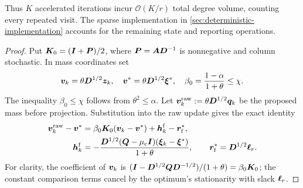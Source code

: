 Thus $K$ accelerated iterations incur $\mathcal{O}(K/r)$ total degree volume,
counting every repeated visit. The sparse implementation in
\cref{sec:deterministic-implementation} accounts for the remaining
state and reporting operations.
\begin{proof}
Put $\bm{K}_0=(\bm{I}+\bm{P})/2$, where $\bm{P}=\bm{A}\bm{D}^{-1}$ is nonnegative
and column stochastic. In mass coordinates set
\[
 \bm{v}_k=\theta\bm{D}^{1/2}\bm{z}_k,\quad
 \bm{v}^*=\theta\bm{D}^{1/2}\bm{\xi}^*,\quad
 \beta_0=\frac{1-\alpha}{1+\theta}\leq\chi.
\]
The inequality $\beta_0\leq\chi$ follows from $\theta^2\leq\alpha$.
Let $\bm{v}_k^{\mathrm{raw}}:=\theta\bm{D}^{1/2}\bm{q}_k$ be the proposed mass
before projection. Substitution into the raw update gives the exact identity
\begin{equation*}
 \begin{aligned}
 \bm{v}_k^{\mathrm{raw}}-\bm{v}^*
   &=\beta_0\bm{K}_0(\bm{v}_k-\bm{v}^*)+\bm{h}_k^{\mathrm{f}}-\bm{r}_{\mathrm{f}}^*,\\
 \bm{h}_k^{\mathrm{f}}&=-\frac{\bm{D}^{1/2}(\bm{Q}-\mu_{\mathrm{c}}\bm{I})
                         (\bm{\xi}_k-\bm{\xi}^*)}{1+\theta},\qquad
 \bm{r}_{\mathrm{f}}^*=\bm{D}^{1/2}\bm{\ell}_r.
 \end{aligned}
\end{equation*}
For clarity, the coefficient of $\bm{v}_k$ is
$(\bm{I}-\bm{D}^{1/2}\bm{Q}\bm{D}^{-1/2})/(1+\theta)=\beta_0\bm{K}_0$;
the constant comparison terms cancel by the optimum's stationarity with
slack $\bm{\ell}_r$.


\end{proof}
